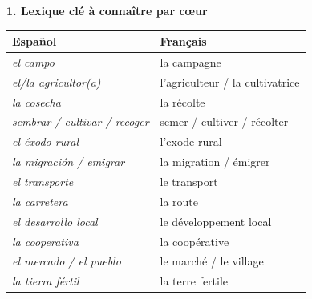 \documentclass[11pt]{article}
\newcommand{\esp}[1]{\ifmmode\text{\textit{#1}}\else\begingroup\selectlanguage{spanish}\itshape #1\endgroup\fi}
\begin{document}
\begin{bilan}
\textbf{1. Lexique clé à connaître par cœur}
\begin{center}
\begin{tabularx}{\linewidth}{|X|X|}
\hline
\rowcolor{popblueL} \textbf{Español} & \textbf{Français} \\
\hline
\esp{el campo} & la campagne \\
\hline
\esp{el/la agricultor(a)} & l'agriculteur / la cultivatrice \\
\hline
\esp{la cosecha} & la récolte \\
\hline
\esp{sembrar / cultivar / recoger} & semer / cultiver / récolter \\
\hline
\esp{el éxodo rural} & l'exode rural \\
\hline
\esp{la migración / emigrar} & la migration / émigrer \\
\hline
\esp{el transporte} & le transport \\
\hline
\esp{la carretera} & la route \\
\hline
\esp{el desarrollo local} & le développement local \\
\hline
\esp{la cooperativa} & la coopérative \\
\hline
\esp{el mercado / el pueblo} & le marché / le village \\
\hline
\esp{la tierra fértil} & la terre fertile \\
\hline
\end{tabularx}
\end{center}


\end{bilan}
\end{document}
